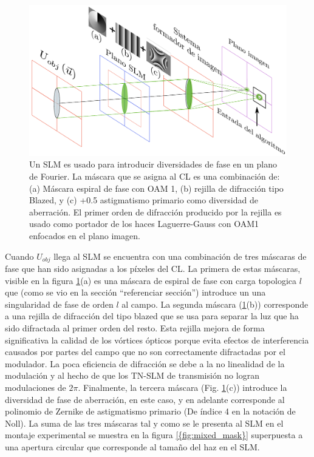 \begin{figure}[h!]
\centering
\includegraphics[scale=.5]{PhaseDiversitySetup_esp.pdf}
\caption[Diagrama del sistema óptico para PD con iluminación coherente.]{Un SLM es usado para introducir diversidades de fase en un
  plano de Fourier. La máscara que se asigna al CL es una combinación de:
  (a) Máscara espiral de fase con OAM 1, (b) rejilla de difracción
  tipo Blazed, y (c) +0.5 astigmatismo primario como diversidad de
  aberración. El primer orden de difracción producido por la rejilla
  es usado como portador de los haces Laguerre-Gauss con OAM1
  enfocados en el plano imagen.} 
\label{fig:set-up}
\end{figure}

Cuando $U_{obj}$ llega al SLM se encuentra con una combinación de tres
máscaras de fase que han sido asignadas a los píxeles del CL. La
primera de estas máscaras, visible en la figura \ref{fig:set-up}(a)  es una máscara de espiral de fase con carga
topologica $l$ que (como
se vio en la sección ``referenciar sección'') introduce un una
singularidad de fase de orden $l$ al campo. La segunda máscara
(\ref{fig:set-up}(b)) corresponde a una rejilla de difracción del tipo
blazed que se usa para separar la luz que ha sido difractada al primer
orden del resto. Esta rejilla mejora de forma significativa la calidad
de los vórtices ópticos porque evita efectos de interferencia causados
por partes del campo que no son correctamente difractadas por el
modulador. La poca eficiencia de difracción se debe a la no linealidad
de la modulación y al hecho de que los TN-SLM de transmisión no logran
modulaciones de $2\pi$.  Finalmente, la tercera máscara
(Fig. \ref{fig:set-up}(c)) introduce la diversidad de fase de
aberración, en este caso, y en adelante corresponde al polinomio de
Zernike de astigmatismo primario (De índice 4 en la notación de
Noll). La suma de las tres máscaras tal y como se le presenta al SLM
en el montaje experimental se muestra en la figura
\ref{{fig:mixed_mask}} superpuesta a una
apertura circular que corresponde al tamaño del haz en el SLM.   

